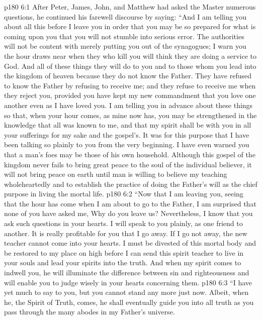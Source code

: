 \vs p180 6:1 After Peter, James, John, and Matthew had asked the Master numerous questions, he continued his farewell discourse by saying: \textcolor{ubdarkred}{“And I am telling you about all this before I leave you in order that you may be so prepared for what is coming upon you that you will not stumble into serious error. The authorities will not be content with merely putting you out of the synagogues; I warn you the hour draws near when they who kill you will think they are doing a service to God. And all of these things they will do to you and to those whom you lead into the kingdom of heaven because they do not know the Father. They have refused to know the Father by refusing to receive me; and they refuse to receive me when they reject you, provided you have kept my new commandment that you love one another even as I have loved you. I am telling you in advance about these things so that, when your hour comes, as mine now has, you may be strengthened in the knowledge that all was known to me, and that my spirit shall be with you in all your sufferings for my sake and the gospel’s. It was for this purpose that I have been talking so plainly to you from the very beginning. I have even warned you that a man’s foes may be those of his own household. Although this gospel of the kingdom never fails to bring great peace to the soul of the individual believer, it will not bring peace on earth until man is willing to believe my teaching wholeheartedly and to establish the practice of doing the Father’s will as the chief purpose in living the mortal life.}
\vs p180 6:2 \textcolor{ubdarkred}{“Now that I am leaving you, seeing that the hour has come when I am about to go to the Father, I am surprised that none of you have asked me, Why do you leave us? Nevertheless, I know that you ask such questions in your hearts. I will speak to you plainly, as one friend to another. It is really profitable for you that I go away. If I go not away, the new teacher cannot come into your hearts. I must be divested of this mortal body and be restored to my place on high before I can send this spirit teacher to live in your souls and lead your spirits into the truth. And when my spirit comes to indwell you, he will illuminate the difference between sin and righteousness and will enable you to judge wisely in your hearts concerning them.}
\vs p180 6:3 \textcolor{ubdarkred}{“I have yet much to say to you, but you cannot stand any more just now. Albeit, when he, the Spirit of Truth, comes, he shall eventually guide you into all truth as you pass through the many abodes in my Father’s universe.}
